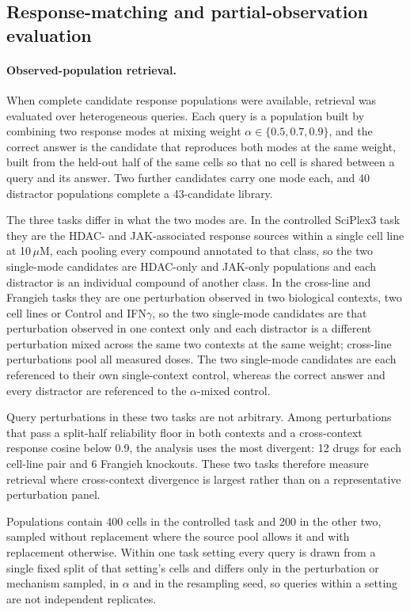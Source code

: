\documentclass[11pt,letterpaper]{article}
\begin{document}
\subsection*{Response-matching and partial-observation evaluation}

\paragraph{Observed-population retrieval.}
When complete candidate response populations were available, retrieval was evaluated over
heterogeneous queries. Each query is a population built by combining two response modes at mixing
weight $\alpha\in\{0.5,0.7,0.9\}$, and the correct answer is the candidate that reproduces both
modes at the same weight, built from the held-out half of the same cells so that no cell is shared
between a query and its answer. Two further candidates carry one mode each, and 40 distractor
populations complete a 43-candidate library.

The three tasks differ in what the two modes are. In the controlled SciPlex3 task they are the
HDAC- and JAK-associated response sources within a single cell line at 10\,$\mu$M, each pooling
every compound annotated to that class, so the two single-mode candidates are HDAC-only and
JAK-only populations and each distractor is an individual compound of another class. In the
cross-line and Frangieh tasks they are one perturbation observed in two biological contexts, two
cell lines or Control and IFN$\gamma$, so the two single-mode candidates are that perturbation
observed in one context only and each distractor is a different perturbation mixed across the same
two contexts at the same weight; cross-line perturbations pool all measured doses. The two
single-mode candidates are each referenced to their own single-context control, whereas the correct
answer and every distractor are referenced to the $\alpha$-mixed control.

Query perturbations in these two tasks are not arbitrary. Among perturbations that pass a
split-half reliability floor in both contexts and a cross-context response cosine below 0.9, the
analysis uses the most divergent: 12 drugs for each cell-line pair and 6 Frangieh knockouts. These
two tasks therefore measure retrieval where cross-context divergence is largest rather than on a
representative perturbation panel.

Populations contain 400 cells in the controlled task and 200 in the other two, sampled without
replacement where the source pool allows it and with replacement otherwise. Within one task
setting every query is drawn from a single fixed split of that setting's cells and differs only in
the perturbation or mechanism sampled, in $\alpha$ and in the resampling seed, so queries within a
setting are not independent replicates.
\end{document}
